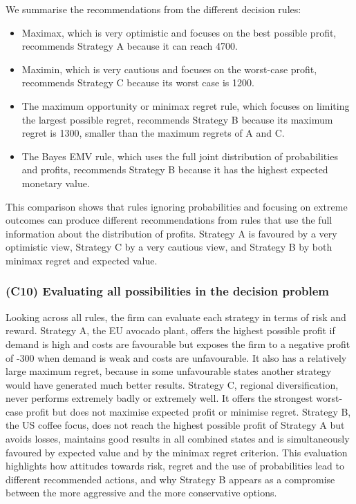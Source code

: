 	We summarise the recommendations from the different decision rules:
	\begin{itemize}
		\item Maximax, which is very optimistic and focuses on the best possible profit, recommends Strategy A because it can reach 4700.
		\item Maximin, which is very cautious and focuses on the worst-case profit, recommends Strategy C because its worst case is 1200.
		\item The maximum opportunity or minimax regret rule, which focuses on limiting the largest possible regret, recommends Strategy B because its maximum regret is 1300, smaller than the maximum regrets of A and C.
		\item The Bayes EMV rule, which uses the full joint distribution of probabilities and profits, recommends Strategy B because it has the highest expected monetary value.
	\end{itemize}
	This comparison shows that rules ignoring probabilities and focusing on extreme outcomes can produce different recommendations from rules that use the full information about the distribution of profits. Strategy A is favoured by a very optimistic view, Strategy C by a very cautious view, and Strategy B by both minimax regret and expected value.
	
	\subsubsection{(C10) Evaluating all possibilities in the decision problem}\label{subsubsec:example2-c10}
	
	Looking across all rules, the firm can evaluate each strategy in terms of risk and reward. Strategy A, the EU avocado plant, offers the highest possible profit if demand is high and costs are favourable but exposes the firm to a negative profit of -300 when demand is weak and costs are unfavourable. It also has a relatively large maximum regret, because in some unfavourable states another strategy would have generated much better results. Strategy C, regional diversification, never performs extremely badly or extremely well. It offers the strongest worst-case profit but does not maximise expected profit or minimise regret. Strategy B, the US coffee focus, does not reach the highest possible profit of Strategy A but avoids losses, maintains good results in all combined states and is simultaneously favoured by expected value and by the minimax regret criterion. This evaluation highlights how attitudes towards risk, regret and the use of probabilities lead to different recommended actions, and why Strategy B appears as a compromise between the more aggressive and the more conservative options.
	
